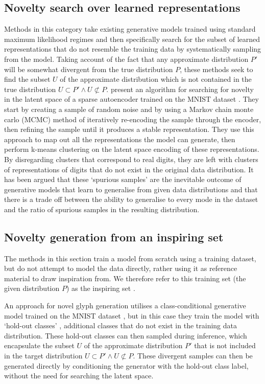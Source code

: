 \subsection{Novelty search over learned representations}
\label{survey:noveltysearch}

Methods in this category take existing generative models trained using standard maximum likelihood regimes and then specifically search for the subset of learned representations that do not resemble the training data by systematically sampling from the model. 
Taking account of the fact that any approximate distribution $P'$ will be somewhat divergent from the true distribution $P$, these methods seek to find the subset $U$ of the approximate distribution which is not contained in the true distribution $U \subset P' \wedge U \not\subset P$. \citet{kazakcci2016digits} present an algorithm for searching for novelty in the latent space of a sparse autoencoder trained on the MNIST dataset \citep{lecun1998gradient}. 
They start by creating a sample of random noise and by using a Markov chain monte carlo (MCMC) method of iteratively re-encoding the sample through the encoder, then refining the sample until it produces a stable representation. 
They use this approach to map out all the representations the model can generate, then perform k-means clustering on the latent space encoding of these representations. 
By disregarding clusters that correspond to real digits, they are left with clusters of representations of digits that do not exist in the original data distribution. 
It has been argued that these `spurious samples' are the inevitable outcome of generative models that learn to generalise from given data distributions \citep{kegl2018spurious} and that there is a trade off between the ability to generalise to every mode in the dataset and the ratio of spurious samples in the resulting distribution. 

\subsection{Novelty generation from an inspiring set}
\label{survey:noveltygeneration}

The methods in this section train a model from scratch using a training dataset, but do not attempt to model the data directly, rather using it as reference material to draw inspiration from. 
We therefore refer to this training set (the given distribution $P$) as the inspiring set \citep{ritchie2007some}.

An approach for novel glyph generation utilises a class-conditional generative model trained on the MNIST dataset \citep{lecun1998gradient}, but in this case they train the model with `hold-out classes' \citep{cherti2017out}, additional classes that do not exist in the training data distribution. 
These hold-out classes can then sampled during inference, which encapsulate the subset $U$ of the approximate distribution $P'$ that is not included in the target distribution $U \subset P' \wedge U \not\subset P$. 
These divergent samples can then be generated directly by conditioning the generator with the hold-out class label, without the need for searching the latent space. 

